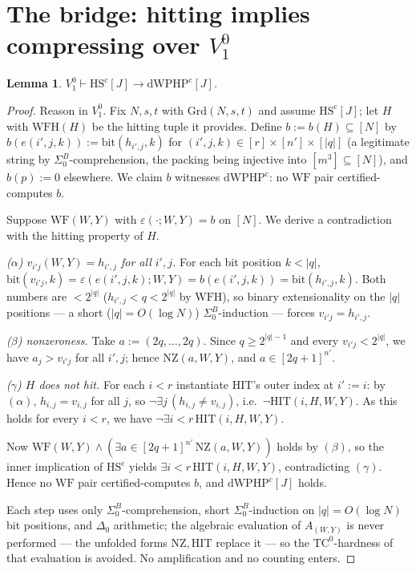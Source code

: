 \documentclass[11pt]{article}
\newtheorem{lemma}[theorem]{Lemma}
\theoremstyle{definition}
\theoremstyle{remark}
\newcommand{\Vone}{V^0_1}
\newcommand{\WF}{\mathrm{WF}}
\newcommand{\WFH}{\mathrm{WFH}}
\newcommand{\NZ}{\mathrm{NZ}}
\newcommand{\HIT}{\mathrm{HIT}}
\newcommand{\Grd}{\mathrm{Grd}}
\newcommand{\HScert}{\mathrm{HS}^{\mathrm{c}}}
\newcommand{\dWPHPcert}{\mathrm{dWPHP}^{\mathrm{c}}}
\newcommand{\SigmaB}{\Sigma^B_0}
\begin{document}
\section{The bridge: hitting implies compressing over $\Vone$}\label{sec:bridge}

\begin{lemma}\label{lem:bridge}
$\Vone\vdash\HScert[J]\to\dWPHPcert[J]$.
\end{lemma}

\begin{proof}
Reason in $\Vone$. Fix $N,s,t$ with $\Grd(N,s,t)$ and assume $\HScert[J]$;
let $H$ with $\WFH(H)$ be the hitting tuple it provides. Define
$b:=b(H)\subseteq[N]$ by $b(e(i',j,k)):=\mathrm{bit}(h_{i',j},k)$ for
$(i',j,k)\in[r]\times[n']\times[|q|]$ (a legitimate string by $\SigmaB$-comprehension,
the packing being injective into $[m^3]\subseteq[N]$), and $b(p):=0$ elsewhere.
We claim $b$ witnesses $\dWPHPcert$: no $\WF$ pair certified-computes $b$.

Suppose $\WF(W,Y)$ with $\varepsilon(\cdot;W,Y)=b$ on $[N]$. We derive a
contradiction with the hitting property of $H$.

\emph{(\(\alpha\)) $v_{i'j}(W,Y)=h_{i',j}$ for all $i',j$.} For each bit position
$k<|q|$, $\mathrm{bit}(v_{i'j},k)=\varepsilon(e(i',j,k);W,Y)=b(e(i',j,k))=
\mathrm{bit}(h_{i',j},k)$. Both numbers are $<2^{|q|}$ ($h_{i',j}<q<2^{|q|}$ by
$\WFH$), so binary extensionality on the $|q|$ positions --- a short
($|q|=O(\log N)$) $\SigmaB$-induction --- forces $v_{i'j}=h_{i',j}$.

\emph{(\(\beta\)) nonzeroness.} Take $a:=(2q,\dots,2q)$. Since $q\ge 2^{|q|-1}$
and every $v_{i'j}<2^{|q|}$, we have $a_j>v_{i'j}$ for all $i',j$; hence
$\NZ(a,W,Y)$, and $a\in[2q+1]^{n'}$.

\emph{(\(\gamma\)) $H$ does not hit.} For each $i<r$ instantiate $\HIT$'s outer
index at $i':=i$: by $(\alpha)$, $h_{i,j}=v_{i,j}$ for all $j$, so
$\neg\exists j\,(h_{i,j}\neq v_{i,j})$, i.e.\ $\neg\HIT(i,H,W,Y)$. As this holds
for every $i<r$, we have $\neg\exists i<r\,\HIT(i,H,W,Y)$.

Now $\WF(W,Y)\wedge(\exists a\in[2q+1]^{n'}\,\NZ(a,W,Y))$ holds by $(\beta)$,
so the inner implication of $\HScert$ yields $\exists i<r\,\HIT(i,H,W,Y)$,
contradicting $(\gamma)$. Hence no $\WF$ pair certified-computes $b$, and
$\dWPHPcert[J]$ holds.

Each step uses only $\SigmaB$-comprehension, short $\SigmaB$-induction on
$|q|=O(\log N)$ bit positions, and $\Delta_0$ arithmetic; the algebraic
evaluation of $A_{(W,Y)}$ is never performed --- the unfolded forms $\NZ,\HIT$
replace it --- so the $\mathrm{TC}^0$-hardness of that evaluation is avoided.
No amplification and no counting enters.
\end{proof}
\end{document}
